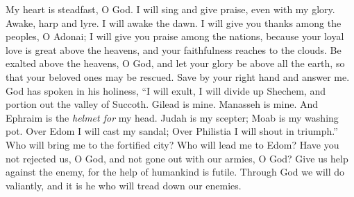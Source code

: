 \begin{biblechapter} %
 My heart is steadfast, O God. 
I will sing and give praise, even with my glory.
\verse Awake, harp and lyre. 
I will awake the dawn.
\verse I will give you thanks among the peoples, O Adonai; 
I will give you praise among the nations,
\verse because your loyal love is great above the heavens, 
and your faithfulness reaches to the clouds.
\verse Be exalted above the heavens, O God, 
and let your glory be above all the earth,
\verse so that your beloved ones may be rescued. 
Save by your right hand and answer me.
\verse God has spoken in his holiness, 
“I will exult, I will divide up Shechem, 
and portion out the valley of Succoth.
\verse Gilead is mine. Manasseh is mine. 
And Ephraim is the \textit{helmet for} my head. 
Judah is my scepter;
\verse Moab is my washing pot. 
Over Edom I will cast my sandal; 
Over Philistia I will shout in triumph.”
\verse Who will bring me to the fortified city? 
Who will lead me to Edom?
\verse Have you not rejected us, O God, 
and not gone out with our armies, O God?
\verse Give us help against the enemy, 
for the help of humankind is futile.
\verse Through God we will do valiantly, 
and it is he who will tread down our enemies.
\end{biblechapter}

